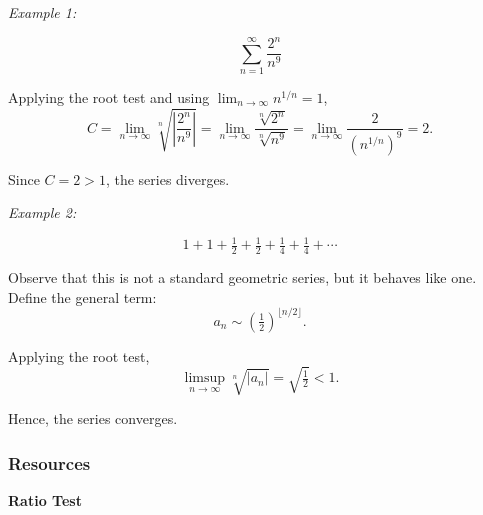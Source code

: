 \textit{Example 1:}

\[
\sum_{n=1}^{\infty} \frac{2^n}{n^9}
\]

Applying the root test and using $\lim_{n \to \infty} n^{1/n} = 1$,
\[
C = \lim_{n \to \infty} \sqrt[n]{\left|\frac{2^n}{n^9}\right|}
= \lim_{n \to \infty} \frac{\sqrt[n]{2^n}}{\sqrt[n]{n^9}}
= \lim_{n \to \infty} \frac{2}{(n^{1/n})^9}
= 2.
\]

Since $C = 2 > 1$, the series diverges.

\medskip

\textit{Example 2:}

\[
1 + 1 + \tfrac{1}{2} + \tfrac{1}{2} + \tfrac{1}{4} + \tfrac{1}{4} + \cdots
\]

Observe that this is not a standard geometric series, but it behaves like one. 
Define the general term:
\[
a_n \sim \left(\tfrac{1}{2}\right)^{\lfloor n/2 \rfloor}.
\]

Applying the root test,
\[
\limsup_{n \to \infty} \sqrt[n]{|a_n|} = \sqrt{\tfrac{1}{2}} < 1.
\]

Hence, the series converges.

\subsubsection{Resources}
\label{sss:reso-ratio-root}

\textbf{Ratio Test}

